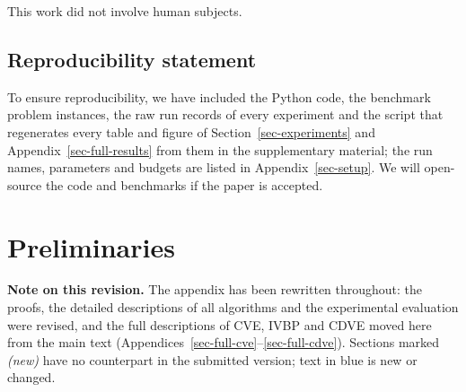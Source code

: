\documentclass{article} %
\newenvironment{revblock}{\color{blue}}{}
\begin{document}

This work did not involve human subjects.

\subsection*{Reproducibility statement}


To ensure reproducibility, we have included the Python code, the benchmark problem instances, the raw run records of every experiment and the script that regenerates every table and figure of Section~\ref{sec-experiments} and Appendix~\ref{sec-full-results} from them in the supplementary material; the run names, parameters and budgets are listed in Appendix~\ref{sec-setup}. We will open-source the code and benchmarks if the paper is accepted. 







\appendix

\section{Preliminaries}
\label{sec:prelim}

\begin{revblock}
\noindent\textbf{Note on this revision.} The appendix has been rewritten throughout: the proofs, the detailed descriptions of all algorithms and the experimental evaluation were revised, and the full descriptions of CVE, IVBP and CDVE moved here from the main text (Appendices~\ref{sec-full-cve}--\ref{sec-full-cdve}). Sections marked \emph{(new)} have no counterpart in the submitted version; text in blue is new or changed.
\end{revblock}
\end{document}
